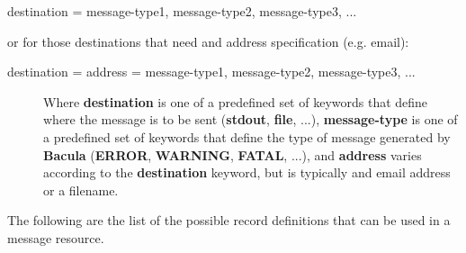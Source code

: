 \begin{description}

\item [destination = message-type1, message-type2, message-type3, ...  ]
   \end{description}

or for those destinations that need and address specification (e.g. email): 

\begin{description}

\item [destination = address = message-type1, message-type2,
   message-type3, ...  ]

Where {\bf destination} is one of a predefined set of keywords that define
where the message is to be sent ({\bf stdout}, {\bf file}, ...), {\bf
message-type} is one of a predefined set of keywords that define the type of
message generated by {\bf Bacula} ({\bf ERROR}, {\bf WARNING}, {\bf FATAL},
...), and {\bf address} varies according to the {\bf destination} keyword, but
is typically and email address or a filename. 
\end{description}

The following are the list of the possible record definitions that can be used
in a message resource. 


